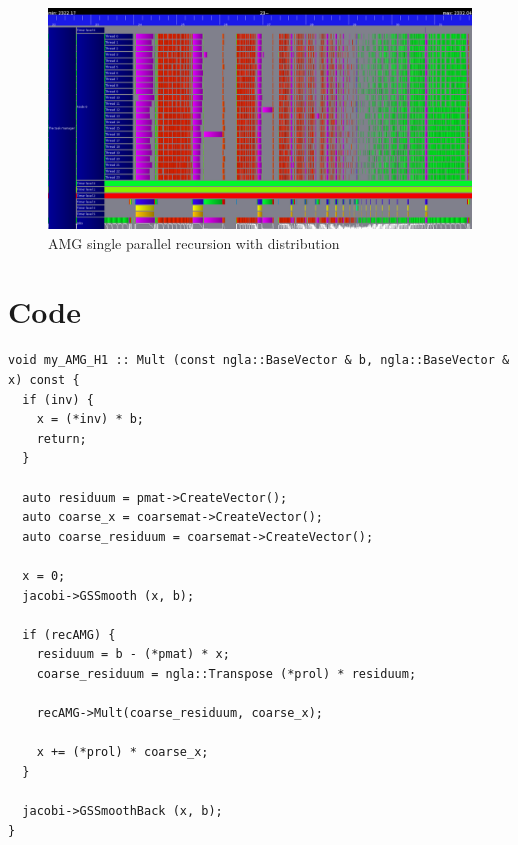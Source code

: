 \documentclass[a4paper,11pt]{scrartcl}
\begin{document}
\begin{figure}
    \includegraphics[width=1\textwidth]{one_iteration.png}
    \caption{AMG single parallel recursion with distribution}\label{figure:stepdis}
\end{figure}

\pagebreak

\section{Code}


\begin{lstlisting}
void my_AMG_H1 :: Mult (const ngla::BaseVector & b, ngla::BaseVector & x) const {
  if (inv) {
    x = (*inv) * b;
    return;
  }

  auto residuum = pmat->CreateVector();
  auto coarse_x = coarsemat->CreateVector();
  auto coarse_residuum = coarsemat->CreateVector();

  x = 0;
  jacobi->GSSmooth (x, b);

  if (recAMG) {
    residuum = b - (*pmat) * x;
    coarse_residuum = ngla::Transpose (*prol) * residuum;

    recAMG->Mult(coarse_residuum, coarse_x);

    x += (*prol) * coarse_x;
  }

  jacobi->GSSmoothBack (x, b);
}
\end{lstlisting}

\label{lst:mult}
\begin{figure}
%

\end{figure}
\end{document}
